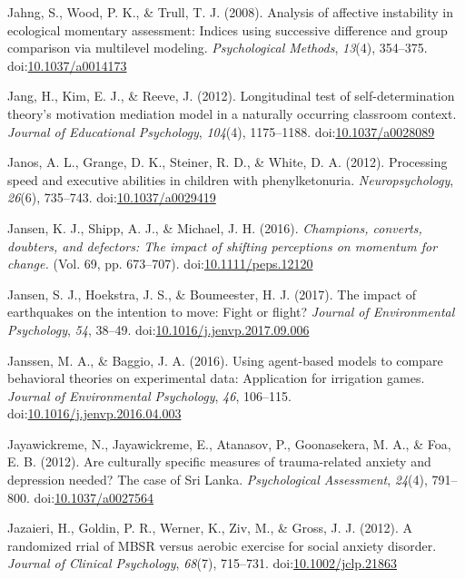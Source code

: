 \documentclass[english,man]{apa6}
\theoremstyle{definition}
\theoremstyle{definition}
\theoremstyle{definition}
\theoremstyle{remark}
\begin{document}
\hypertarget{ref-Jahng2008}{}
Jahng, S., Wood, P. K., \& Trull, T. J. (2008). Analysis of affective
instability in ecological momentary assessment: Indices using successive
difference and group comparison via multilevel modeling.
\emph{Psychological Methods}, \emph{13}(4), 354--375.
doi:\href{https://doi.org/10.1037/a0014173}{10.1037/a0014173}

\hypertarget{ref-Jang2012}{}
Jang, H., Kim, E. J., \& Reeve, J. (2012). Longitudinal test of
self-determination theory's motivation mediation model in a naturally
occurring classroom context. \emph{Journal of Educational Psychology},
\emph{104}(4), 1175--1188.
doi:\href{https://doi.org/10.1037/a0028089}{10.1037/a0028089}

\hypertarget{ref-Janos2012}{}
Janos, A. L., Grange, D. K., Steiner, R. D., \& White, D. A. (2012).
Processing speed and executive abilities in children with
phenylketonuria. \emph{Neuropsychology}, \emph{26}(6), 735--743.
doi:\href{https://doi.org/10.1037/a0029419}{10.1037/a0029419}

\hypertarget{ref-Jansen2016}{}
Jansen, K. J., Shipp, A. J., \& Michael, J. H. (2016). \emph{Champions,
converts, doubters, and defectors: The impact of shifting perceptions on
momentum for change.} (Vol. 69, pp. 673--707).
doi:\href{https://doi.org/10.1111/peps.12120}{10.1111/peps.12120}

\hypertarget{ref-Jansen2017}{}
Jansen, S. J., Hoekstra, J. S., \& Boumeester, H. J. (2017). The impact
of earthquakes on the intention to move: Fight or flight? \emph{Journal
of Environmental Psychology}, \emph{54}, 38--49.
doi:\href{https://doi.org/10.1016/j.jenvp.2017.09.006}{10.1016/j.jenvp.2017.09.006}

\hypertarget{ref-Janssen2016}{}
Janssen, M. A., \& Baggio, J. A. (2016). Using agent-based models to
compare behavioral theories on experimental data: Application for
irrigation games. \emph{Journal of Environmental Psychology}, \emph{46},
106--115.
doi:\href{https://doi.org/10.1016/j.jenvp.2016.04.003}{10.1016/j.jenvp.2016.04.003}

\hypertarget{ref-Jayawickreme2012}{}
Jayawickreme, N., Jayawickreme, E., Atanasov, P., Goonasekera, M. A., \&
Foa, E. B. (2012). Are culturally specific measures of trauma-related
anxiety and depression needed? The case of Sri Lanka.
\emph{Psychological Assessment}, \emph{24}(4), 791--800.
doi:\href{https://doi.org/10.1037/a0027564}{10.1037/a0027564}

\hypertarget{ref-Jazaieri2012}{}
Jazaieri, H., Goldin, P. R., Werner, K., Ziv, M., \& Gross, J. J.
(2012). A randomized rrial of MBSR versus aerobic exercise for social
anxiety disorder. \emph{Journal of Clinical Psychology}, \emph{68}(7),
715--731.
doi:\href{https://doi.org/10.1002/jclp.21863}{10.1002/jclp.21863}
\end{document}
